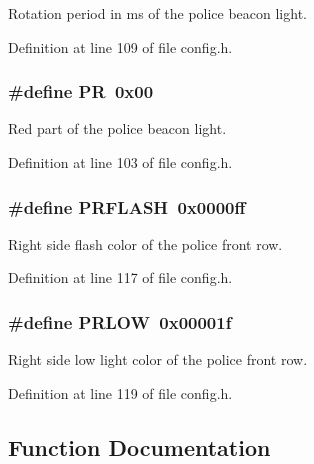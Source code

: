 Rotation period in ms of the police beacon light. 



Definition at line 109 of file config.\+h.

\subsubsection[{\texorpdfstring{PR}{PR}}]{\setlength{\rightskip}{0pt plus 5cm}\#define PR~0x00}\hypertarget{group__police_ga088f4c3612d1ab1c9f6f139234ae533b}{}\label{group__police_ga088f4c3612d1ab1c9f6f139234ae533b}


Red part of the police beacon light. 



Definition at line 103 of file config.\+h.

\subsubsection[{\texorpdfstring{P\+R\+F\+L\+A\+SH}{PRFLASH}}]{\setlength{\rightskip}{0pt plus 5cm}\#define P\+R\+F\+L\+A\+SH~0x0000ff}\hypertarget{group__police_gac9d0142b6f8cc7735af13e6b91503b97}{}\label{group__police_gac9d0142b6f8cc7735af13e6b91503b97}


Right side flash color of the police front row. 



Definition at line 117 of file config.\+h.

\subsubsection[{\texorpdfstring{P\+R\+L\+OW}{PRLOW}}]{\setlength{\rightskip}{0pt plus 5cm}\#define P\+R\+L\+OW~0x00001f}\hypertarget{group__police_gaf4a707e896c2e6df7a0215e4100d75aa}{}\label{group__police_gaf4a707e896c2e6df7a0215e4100d75aa}


Right side low light color of the police front row. 



Definition at line 119 of file config.\+h.



\subsection{Function Documentation}
